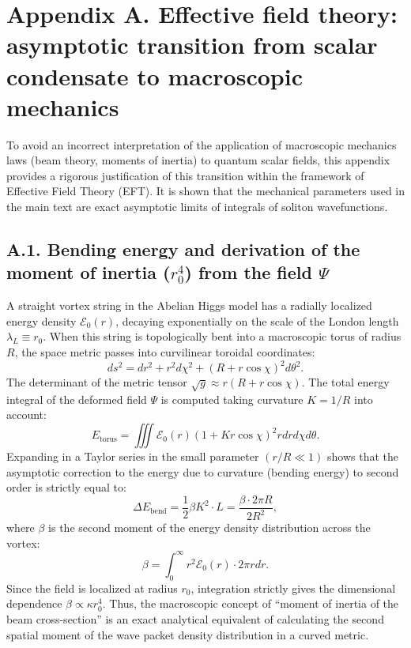 \documentclass[11pt,a4paper]{article}
\begin{document}
\section*{Appendix A. Effective field theory: asymptotic transition from scalar condensate to macroscopic mechanics}

To avoid an incorrect interpretation of the application of macroscopic mechanics laws (beam theory, moments of inertia) to quantum scalar fields, this appendix provides a rigorous justification of this transition within the framework of Effective Field Theory (EFT). It is shown that the mechanical parameters used in the main text are exact asymptotic limits of integrals of soliton wavefunctions.

\subsection*{A.1. Bending energy and derivation of the moment of inertia ($r_0^4$) from the field $\Psi$}
A straight vortex string in the Abelian Higgs model has a radially localized energy density $\mathcal{E}_0(r)$, decaying exponentially on the scale of the London length $\lambda_L \equiv r_0$. When this string is topologically bent into a macroscopic torus of radius $R$, the space metric passes into curvilinear toroidal coordinates:
\begin{equation}
ds^2 = dr^2 + r^2 d\chi^2 + (R + r\cos\chi)^2 d\theta^2.
\end{equation}
The determinant of the metric tensor $\sqrt{g} \approx r(R + r\cos\chi)$. The total energy integral of the deformed field $\Psi$ is computed taking curvature $K = 1/R$ into account:
\begin{equation}
E_{\text{torus}} = \iiint \mathcal{E}_0(r) \left(1 + K r\cos\chi\right)^2 r dr d\chi d\theta.
\end{equation}
Expanding in a Taylor series in the small parameter $(r/R \ll 1)$ shows that the asymptotic correction to the energy due to curvature (bending energy) to second order is strictly equal to:
\begin{equation}
\Delta E_{\text{bend}} = \frac{1}{2} \beta K^2 \cdot L = \frac{\beta \cdot 2\pi R}{2 R^2},
\end{equation}
where $\beta$ is the second moment of the energy density distribution across the vortex:
\begin{equation}
\beta = \int_0^\infty r^2 \mathcal{E}_0(r) \cdot 2\pi r dr.
\end{equation}
Since the field is localized at radius $r_0$, integration strictly gives the dimensional dependence $\beta \propto \kappa r_0^4$. Thus, the macroscopic concept of ``moment of inertia of the beam cross-section'' is an exact analytical equivalent of calculating the second spatial moment of the wave packet density distribution in a curved metric.
\end{document}
